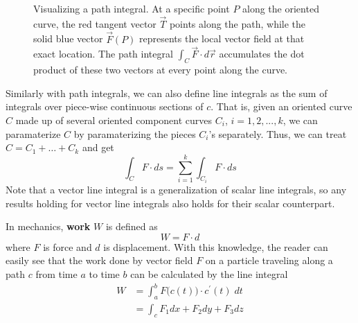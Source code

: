 \begin{definition}
\begin{figure}[H]
  \caption{Visualizing a path integral. At a specific point $P$ along the oriented curve, the red tangent vector $\vec{T}$ points along the path, while the solid blue vector $\vec{F}(P)$ represents the local vector field at that exact location. The path integral $\int_C \vec{F} \cdot d\vec{r}$ accumulates the dot product of these two vectors at every point along the curve.}
  \label{fig:vector_field_tangent}
\end{figure}

		Similarly with path integrals, we can also define line integrals as the sum of integrals over piece-wise continuous sections of $c$. That is, given an oriented curve $C$ made up of several oriented component curves $C_i$, $i = 1, 2, ..., k$, we can paramaterize $C$ by paramaterizing the pieces $C_i$'s separately. Thus, we can treat $C = C_1 + \ldots + C_k$ and get
		\begin{equation}
			\int_C F \cdot d s = \sum_{i = 1}^k \int_{C_i} F \cdot d s
		\end{equation}
		Note that a vector line integral is a generalization of scalar line integrals, so any results holding for vector line integrals also holds for their scalar counterpart. 
  \end{definition}

  \begin{example}[Work]
		In mechanics, \textbf{work} $W$ is defined as 
		\begin{equation}
			W = F \cdot d
		\end{equation}
		where $F$ is force and $d$ is displacement. With this knowledge, the reader can easily see that the work done by vector field $F$ on a particle traveling along a path $c$ from time $a$ to time $b$ can be calculated by the line integral
		\begin{align}
			W & = \int_a^b F\big( c(t)\big) \cdot c^\prime (t) \; d t \\
			& = \int_c F_1 dx + F_2 dy + F_3 dz
		\end{align}
  \end{example}

